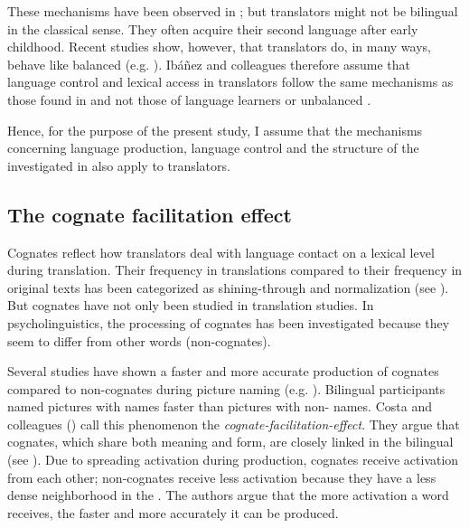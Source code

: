 \documentclass[output=paper]{LSP/langsci}
\begin{document}
\largerpage
These mechanisms have been observed in ; but translators might not be bilingual in the classical sense. They often acquire their second language after early childhood. Recent studies show, however, that translators do, in many ways, behave like balanced  (e.g. \citealt{Ibanez2010}). Ibáñez and colleagues therefore assume that language control and lexical access in translators follow the same mechanisms as those found in  and not those of language learners or unbalanced . 

Hence, for the purpose of the present study, I assume that the mechanisms concerning language production, language control and the structure of the  investigated in  also apply to translators.

\subsection{The cognate facilitation effect}\label{oster:sec:1.4}
Cognates reflect how translators deal with language contact on a lexical level during translation. Their frequency in translations compared to their frequency in original texts has been categorized as shining-through and normalization (see ). But cognates have not only been studied in translation studies. In psycholinguistics, the processing of cognates has been investigated because they seem to differ from other words (non-cognates).

Several studies have shown a faster and more accurate production of cognates compared to non-cognates during picture naming (e.g. \citealt{Costa2000}). Bilingual participants named pictures with  names faster than pictures with non- names. Costa and colleagues (\citeyear{Costa2000}) call this phenomenon the \textit{cognate-facilitation-effect}. They argue that cognates, which share both meaning and form, are closely linked in the bilingual  (see ). Due to spreading activation during production, cognates receive activation from each other; non-cognates receive less activation because they have a less dense neighborhood in the . The authors argue that the more activation a word receives, the faster and more accurately it can be produced. 
\end{document}
